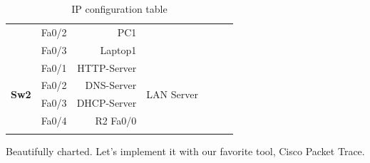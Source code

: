\documentclass[11pt,a4paper]{report}
\begin{document}
\begin{longtable}[c]{@{}llrllrr@{}}
                                                               & Fa0/2                        & PC1                       &                                                       & \multicolumn{3}{c}{}                                                                                                                                                 \\
                                                               & Fa0/3                        & Laptop1                   &                                                       & \multicolumn{3}{c}{}                                                                                                                                                 \\* \midrule
            \multirow{4}{*}{\textbf{Sw2}}                      & Fa0/1                        & HTTP-Server               & \multirow{4}{*}{LAN Server}                           & \multicolumn{3}{c}{\multirow{4}{*}{}}                                                                                                                                \\
                                                               & Fa0/2                        & DNS-Server                &                                                       & \multicolumn{3}{c}{}                                                                                                                                                 \\
                                                               & Fa0/3                        & DHCP-Server               &                                                       & \multicolumn{3}{c}{}                                                                                                                                                 \\
                                                               & Fa0/4                        & R2 Fa0/0                  &                                                       & \multicolumn{3}{c}{}                                                                                                                                                 \\* \bottomrule
            \caption{IP configuration table}
            \label{tab:ipconftable}\\
        \end{longtable}

        Beautifully charted. Let's implement it with our favorite tool, Cisco Packet Trace.
\end{document}
